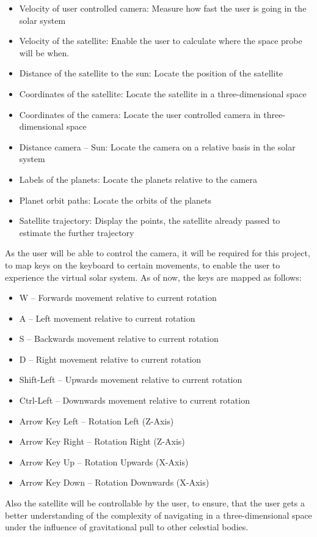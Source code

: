 \documentclass[conference,compsoc]{IEEEtran}
\begin{document}
\begin{itemize}
	\item Velocity of user controlled camera: Measure how fast the user is going in the solar system
	\item Velocity of the satellite: Enable the user to calculate where the space probe will be when.
	\item Distance of the satellite to the sun: Locate the position of the satellite
	\item Coordinates of the satellite: Locate the satellite in a three-dimensional space
	\item Coordinates of the camera: Locate the user controlled camera in three-dimensional space
	\item Distance camera – Sun: Locate the camera on a relative basis in the solar system
	\item Labels of the planets: Locate the planets relative to the camera
	\item Planet orbit paths: Locate the orbits of the planets
	\item Satellite trajectory: Display the points, the satellite already passed to estimate the further trajectory
\end{itemize}
As the user will be able to control the camera, it will be required for this project, to map keys on the keyboard to certain movements, to enable the user to experience the virtual solar system. As of now, the keys are mapped as follows:
\begin{itemize}
	\item W – Forwards movement relative to current rotation
	\item A – Left movement relative to current rotation
	\item S – Backwards movement relative to current rotation
	\item D – Right movement relative to current rotation
	\item Shift-Left – Upwards movement relative to current rotation
	\item Ctrl-Left – Downwards movement relative to current rotation
	\item Arrow Key Left – Rotation Left (Z-Axis)
	\item Arrow Key Right – Rotation Right (Z-Axis)
	\item Arrow Key Up – Rotation Upwards (X-Axis)
	\item Arrow Key Down – Rotation Downwards (X-Axis)
\end{itemize}
Also the  satellite will be controllable by the user, to ensure, that the user gets a better understanding of the complexity of navigating in a three-dimensional space under the influence of gravitational pull to other celestial bodies. 
\end{document}
